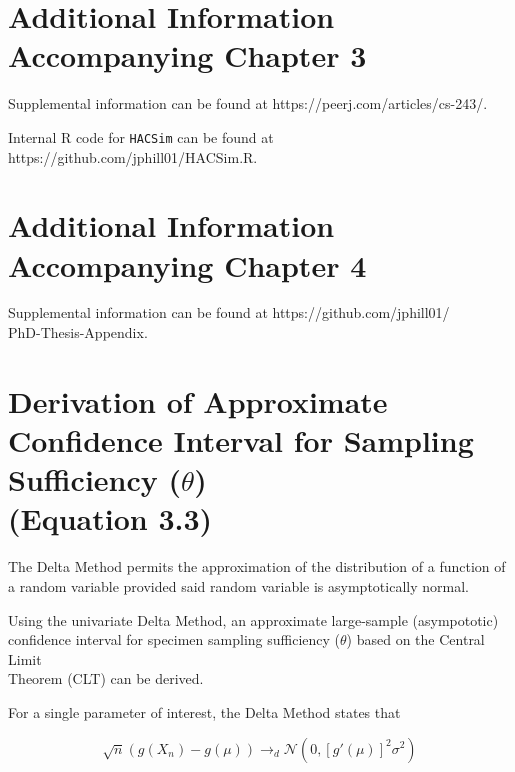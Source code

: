 \linespread{1.0}


\appendix

\chapter{Additional Information Accompanying Chapter 3}

Supplemental information can be found at https://peerj.com/articles/cs-243/. 

\vspace{5mm}

Internal R code for {\tt HACSim} can be found at https://github.com/jphill01/HACSim.R.


\chapter{Additional Information Accompanying Chapter 4}

Supplemental information can be found at https://github.com/jphill01/\\PhD-Thesis-Appendix.

\chapter{Derivation of Approximate Confidence Interval for Sampling Sufficiency ($\theta$) \\ (Equation 3.3)}

The Delta Method permits the approximation of the distribution of a function of a random variable provided said random variable is asymptotically normal.

\vspace{5mm}

Using the univariate Delta Method, an approximate large-sample (asympototic) \\ confidence interval for specimen sampling sufficiency ($\theta$) based on the Central Limit \\ Theorem (CLT) can be derived.  

\vspace{5mm}

For a single parameter of interest, the Delta Method states that

\begin{equation}
\sqrt{n}(g(X_n) - g(\mu)) \rightarrow_d \mathcal{N}(0, [g'(\mu)]^2\sigma^2)
\end{equation}

